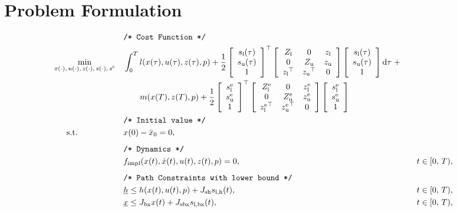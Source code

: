 \documentclass{article}
\newcommand{\tran}{^\top}
\newcommand{\ind}[1]{_{\textrm{#1}}}
\newcommand{\terminal}{^{\textrm{e}}}
\newcommand{\matr}[2]{\left[\begin{array}{#1}#2\end{array}\right]}
\newcommand{\Lower}{\ind{l}}
\newcommand{\lowerh}{\ind{l,h}}
\newcommand{\lowerbx}{\ind{l,bx}}
\newcommand{\upper}{\ind{u}}
\newcommand{\mathComment}[1]{\texttt{/* #1 */}}
\begin{document}
	

	
\section*{Problem Formulation}
	
\begin{align*}
	&&&\mathComment{Cost Function}\\
	&\underset{\begin{subarray}{c}
		x(\cdot),\,u(\cdot), \, z(\cdot), \, s(\cdot), \, s\terminal
		\end{subarray}}{\min}
	&&\int_0^T l(x(\tau), u(\tau), z(\tau), p)
	 + \frac{1}{2} \matr{c}{s\Lower(\tau) \\ s\upper(\tau) \\ 1} \tran
	  \matr{ccc} { Z\Lower & 0 & z\Lower \\
	  0 & Z\upper & z\upper \\
		{z\Lower}\tran & {z\upper}\tran & 0}
	\matr{c}{s\Lower(\tau) \\ s\upper(\tau) \\ 1} \mathrm{d}\tau \; + \\
	 &&& \quad \quad m(x(T), z(T), p) +
	  \frac{1}{2} \matr{c}{s\Lower\terminal \\ s\upper\terminal \\ 1} \tran
	 \matr{ccc} { Z\Lower\terminal & 0 & z\Lower\terminal \\
	 	0 & Z\upper\terminal & z\upper\terminal \\
	 	{z\Lower\terminal}\tran & {z\upper\terminal}\tran & 0}
	 \matr{c}{s\Lower\terminal \\ s\upper\terminal \\ 1}
	 \\
	&&&\mathComment{Initial value}\\
	&\,\,\,\quad \text{s.t.}    &&x(0) - \bar{x}_0 = 0, &&\\
	&&& && \\[-1em]
	&&&\mathComment{Dynamics}\\
	&&& f\ind{impl}(x(t), \dot{x}(t), u(t), z(t), p) = 0, &&\quad t \in [0,\,T),\\
	&&& && \\[-1em]
	&&&\mathComment{Path Constraints with lower bound}\\
	&&&\underline{h} \leq h(x(t), u(t), p) + J_{\textrm{sh}} s\lowerh(t), &&\quad t \in [0,\,T),\\
	&&&\underline{x} \leq J_{\textrm{bx}} x(t) + J_{\textrm{sbx}} s\lowerbx(t), &&\quad t \in [0,\,T),\\

\end{align*}
\end{document}
